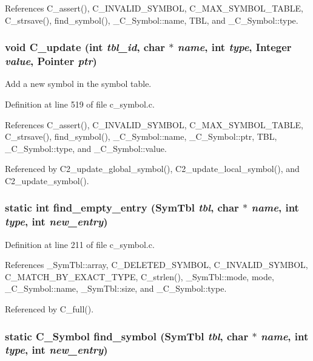 References C\_\-assert(), C\_\-INVALID\_\-SYMBOL, C\_\-MAX\_\-SYMBOL\_\-TABLE, C\_\-strsave(), find\_\-symbol(), \_\-C\_\-Symbol::name, TBL, and \_\-C\_\-Symbol::type.
\subsubsection{\setlength{\rightskip}{0pt plus 5cm}void C\_\-update (int {\em tbl\_\-id}, char $\ast$ {\em name}, int {\em type}, \bf{Integer} {\em value}, \bf{Pointer} {\em ptr})}\label{c__symbol_8c_13838f31c0fd9fb771ca279c949b65dd}


Add a new symbol in the symbol table. 

Definition at line 519 of file c\_\-symbol.c.

References C\_\-assert(), C\_\-INVALID\_\-SYMBOL, C\_\-MAX\_\-SYMBOL\_\-TABLE, C\_\-strsave(), find\_\-symbol(), \_\-C\_\-Symbol::name, \_\-C\_\-Symbol::ptr, TBL, \_\-C\_\-Symbol::type, and \_\-C\_\-Symbol::value.

Referenced by C2\_\-update\_\-global\_\-symbol(), C2\_\-update\_\-local\_\-symbol(), and C2\_\-update\_\-symbol().
\subsubsection{\setlength{\rightskip}{0pt plus 5cm}static int find\_\-empty\_\-entry (\bf{Sym\-Tbl} {\em tbl}, char $\ast$ {\em name}, int {\em type}, int {\em new\_\-entry})\hspace{0.3cm}{\tt  [static]}}\label{c__symbol_8c_ca2159f943181843eac538b2428f7c0d}




Definition at line 211 of file c\_\-symbol.c.

References \_\-Sym\-Tbl::array, C\_\-DELETED\_\-SYMBOL, C\_\-INVALID\_\-SYMBOL, C\_\-MATCH\_\-BY\_\-EXACT\_\-TYPE, C\_\-strlen(), \_\-Sym\-Tbl::mode, mode, \_\-C\_\-Symbol::name, \_\-Sym\-Tbl::size, and \_\-C\_\-Symbol::type.

Referenced by C\_\-full().
\subsubsection{\setlength{\rightskip}{0pt plus 5cm}static \bf{C\_\-Symbol} find\_\-symbol (\bf{Sym\-Tbl} {\em tbl}, char $\ast$ {\em name}, int {\em type}, int {\em new\_\-entry})\hspace{0.3cm}{\tt  [static]}}\label{c__symbol_8c_5f67c9007676a17cb9da613fc79e995c}




